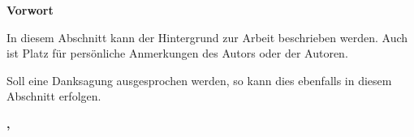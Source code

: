 \clearpage

{\LARGE\textbf{Vorwort}}
\vspace{1em}

\itshape

In diesem Abschnitt kann der Hintergrund zur Arbeit beschrieben werden. Auch ist Platz für persönliche Anmerkungen des Autors oder der Autoren.

Soll eine Danksagung ausgesprochen werden, so kann dies ebenfalls in diesem Abschnitt erfolgen.

\normalfont

\vspace{1em}
\begin{flushright}
    \textbf{\firstAuthor,\xspace \documentMonthOfYear \documentYear}
\end{flushright}
